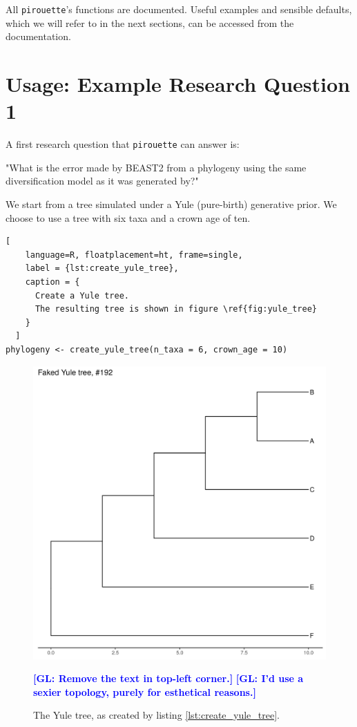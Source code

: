 \documentclass{article}
\newcommand{\giovanni}[1]{\textcolor{blue}{\textbf{[GL: #1]}}}
\begin{document}
All \verb;pirouette;'s functions are documented. 
Useful examples and sensible defaults, 
which we will refer to in the next sections, 
can be accessed from the documentation.

\section{Usage: Example Research Question 1}

A first research question that \verb;pirouette; can answer is:

"What is the error made by BEAST2 from a phylogeny 
using the same diversification model as it was generated by?"

We start from a tree simulated under a Yule (pure-birth) generative prior. 
We choose to use a tree with six taxa and a crown age of ten.

\begin{lstlisting}[
    language=R, floatplacement=ht, frame=single, 
    label = {lst:create_yule_tree}, 
    caption = {
      Create a Yule tree. 
      The resulting tree is shown in figure \ref{fig:yule_tree}
    }
  ]
phylogeny <- create_yule_tree(n_taxa = 6, crown_age = 10)
\end{lstlisting}

\begin{figure}[ht]
  \includegraphics[width=\textwidth]{tree_yule.png}
  \caption{The Yule tree, as created by listing \ref{lst:create_yule_tree}.}
  \label{fig:yule_tree}
  \giovanni{Remove the text in top-left corner.}
  \giovanni{I'd use a sexier topology, purely for esthetical reasons.}
\end{figure}
\end{document}
